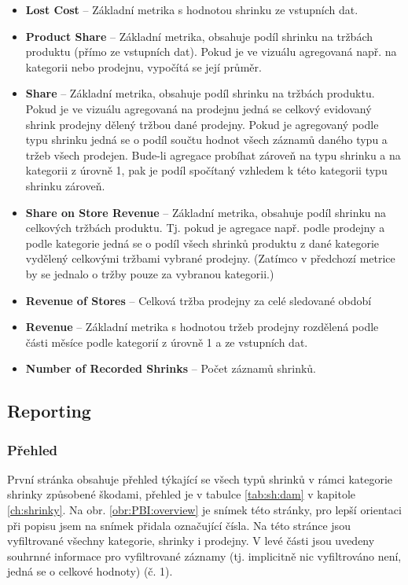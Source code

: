 \begin{itemize}
    \itemsep-0.3em
    \item     \textbf{Lost Cost} -- Základní metrika s hodnotou shrinku ze vstupních dat.
    \item     \textbf{Product Share} -- Základní metrika, obsahuje podíl shrinku na tržbách produktu (přímo ze vstupních dat). Pokud je ve vizuálu agregovaná např. na kategorii nebo prodejnu, vypočítá se její průměr.
    \item     \textbf{Share} -- Základní metrika, obsahuje podíl shrinku na tržbách produktu. Pokud je ve vizuálu agregovaná na prodejnu jedná se celkový evidovaný shrink prodejny dělený tržbou dané prodejny. Pokud je agregovaný podle typu shrinku jedná se o podíl součtu hodnot všech záznamů daného typu a tržeb všech prodejen. Bude-li agregace probíhat zároveň na typu shrinku a na kategorii z úrovně 1, pak je podíl spočítaný vzhledem k této kategorii typu shrinku zároveň. 
    \item     \textbf{Share on Store Revenue} -- Základní metrika, obsahuje podíl shrinku na celkových tržbách produktu. Tj. pokud je agregace např. podle prodejny a podle kategorie jedná se o podíl všech shrinků produktu z dané kategorie vydělený celkovými tržbami vybrané prodejny. (Zatímco v předchozí metrice by se jednalo o tržby pouze za vybranou kategorii.)
    \item     \textbf{Revenue of Stores} -- Celková tržba prodejny za celé sledované období
    \item     \textbf{Revenue} -- Základní metrika s hodnotou tržeb prodejny rozdělená podle části měsíce podle kategorií z úrovně 1 a  ze vstupních dat.
    \item     \textbf{Number of Recorded Shrinks} -- Počet záznamů shrinků.
\end{itemize}

\subsection{Reporting}

\subsubsection*{Přehled}

První stránka obsahuje přehled týkající se všech typů shrinků v rámci kategorie shrinky způsobené škodami, přehled je v tabulce \ref*{tab:sh:dam} v kapitole \ref*{ch:shrinky}. Na obr. \ref*{obr:PBI:overview} je snímek této stránky, pro lepší orientaci při popisu jsem na snímek přidala označující čísla. Na této stránce jsou vyfiltrované všechny kategorie, shrinky i prodejny. V levé části jsou uvedeny souhrnné informace pro vyfiltrované záznamy (tj. implicitně nic vyfiltrováno není, jedná se o celkové hodnoty) (č. 1). 


